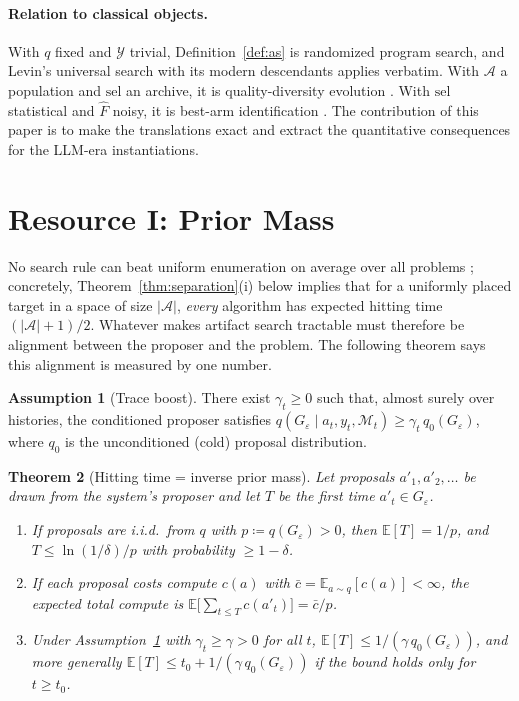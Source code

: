 \documentclass{article}
\theoremstyle{plain}
\newtheorem{theorem}{Theorem}[section]
\theoremstyle{definition}
\newtheorem{assumption}[theorem]{Assumption}
\theoremstyle{remark}
\newcommand{\A}{\mathcal{A}}
\newcommand{\Y}{\mathcal{Y}}
\newcommand{\M}{\mathcal{M}}
\newcommand{\E}{\mathbb{E}}
\newcommand{\sel}{\mathrm{sel}}
\newcommand{\Fhat}{\widehat{F}}
\newcommand{\eps}{\varepsilon}
\begin{document}
\paragraph{Relation to classical objects.}
With $q$ fixed and $\Y$ trivial, Definition~\ref{def:as} is randomized program search, and Levin's universal search \cite{levin1973universal, solomonoff1964formal} with its modern descendants \cite{schmidhuber2004oops, schmidhuber1997shifting, hutter2005universal, achille2025universal} applies verbatim. With $\A$ a population and $\sel$ an archive, it is quality-diversity evolution \cite{lehman2011abandoning, mouret2015illuminating}. With $\sel$ statistical and $\Fhat$ noisy, it is best-arm identification \cite{maron1994hoeffding, evendar2006action, karnin2013almost, li2017hyperband}. The contribution of this paper is to make the translations exact and extract the quantitative consequences for the LLM-era instantiations.

\section{Resource I: Prior Mass}
\label{sec:prior}

No search rule can beat uniform enumeration on average over all problems \cite{wolpert1997no}; concretely, Theorem~\ref{thm:separation}(i) below implies that for a uniformly placed target in a space of size $|\A|$, \emph{every} algorithm has expected hitting time $(|\A|+1)/2$. Whatever makes artifact search tractable must therefore be alignment between the proposer and the problem. The following theorem says this alignment is measured by one number.

\begin{assumption}[Trace boost]
\label{ass:boost}
There exist $\gamma_t \ge 0$ such that, almost surely over histories, the conditioned proposer satisfies $q(G_\eps \mid a_t, y_t, \M_t) \ge \gamma_t\, q_0(G_\eps)$, where $q_0$ is the unconditioned (cold) proposal distribution.
\end{assumption}

\begin{theorem}[Hitting time = inverse prior mass]
\label{thm:hitting}
Let proposals $a'_1, a'_2, \ldots$ be drawn from the system's proposer and let $T$ be the first time $a'_t \in G_\eps$.
\begin{enumerate}\itemsep1pt
\item[(i)] If proposals are i.i.d.\ from $q$ with $p \coloneqq q(G_\eps) > 0$, then $\E[T] = 1/p$, and $T \le \ln(1/\delta)/p$ with probability $\ge 1-\delta$.
\item[(ii)] If each proposal costs compute $c(a)$ with $\bar{c} = \E_{a \sim q}[c(a)] < \infty$, the expected total compute is $\E\big[\sum_{t \le T} c(a'_t)\big] = \bar{c}/p$.
\item[(iii)] Under Assumption~\ref{ass:boost} with $\gamma_t \ge \gamma > 0$ for all $t$, $\E[T] \le 1/(\gamma\, q_0(G_\eps))$, and more generally $\E[T] \le t_0 + 1/(\gamma\, q_0(G_\eps))$ if the bound holds only for $t \ge t_0$.
\end{enumerate}
\end{theorem}
\end{document}
